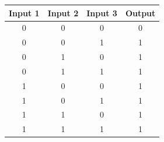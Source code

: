 \begin{figure}[H]
  \begin{subfigure}[t]{.49\columnwidth}

      \begin{adjustbox}{width=\textwidth}
    \begin{tabular}[b]{cccc}
      \hline
    \multicolumn{1}{l}{\textbf{Input 1}} & \multicolumn{1}{l}{\textbf{Input 2}} & \multicolumn{1}{l}{\textbf{Input 3}} & \multicolumn{1}{l}{\textbf{Output}} \\
    \hline
    0 & 0                                    & 0                                    & 0                                   \\
    0 & 0                                    & 1                                    & 1                                   \\
    0 & 1                                    & 0                                    & 1                                   \\
    0 & 1                                    & 1                                    & 1                                   \\
    1 & 0                                    & 0                                    & 1                                   \\
    1 & 0                                    & 1                                    & 1                                   \\
    1 & 1                                    & 0                                    & 1                                   \\
    1 & 1                                    & 1                                    & 1                                   \\


\end{tabular}
\end{adjustbox}
\end{subfigure}
\end{figure}
